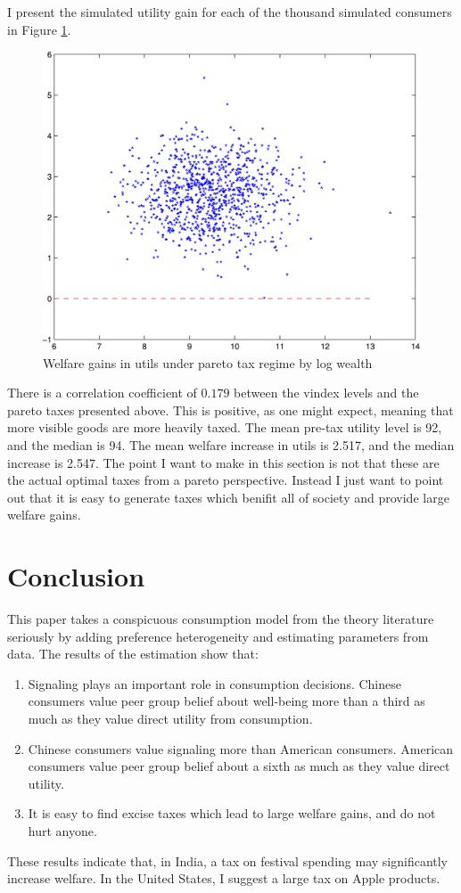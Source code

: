 \documentclass[12pt]{article}
\begin{document}
I present the simulated utility gain for each of the thousand simulated consumers in Figure \ref{fig:taxscatter}.
\begin{figure}
    \centering 
	\includegraphics[scale=.8]{pics/taxscat_cropped.jpg}
    \caption{Welfare gains in utils under pareto tax regime by log wealth}
    \label{fig:taxscatter}
\end{figure}
There is a correlation coefficient of $0.179$ between the vindex levels and the pareto taxes presented above.  This is positive, as one might expect, meaning that more visible goods are more heavily taxed.
The mean pre-tax utility level is 92, and the median is 94.  The mean welfare increase in utils is 2.517, and the median increase is 2.547.  The point I want to make in this section is not that these are the actual optimal taxes from a pareto perspective.  Instead I just want to point out that it is easy to generate taxes which benifit all of society and provide large welfare gains.

\section{Conclusion}
This paper takes a conspicuous consumption model from the theory literature seriously by adding preference heterogeneity and estimating parameters from data.
The results of the estimation show that:
\begin{enumerate}
    \item Signaling plays an important role in consumption decisions.  Chinese consumers value peer group belief about well-being more than a third as much as they value direct utility from consumption.
    \item Chinese consumers value signaling more than American consumers.  American consumers value peer group belief about a sixth as much as they value direct utility.
    \item It is easy to find excise taxes which lead to large welfare gains, and do not hurt anyone.
\end{enumerate}
	These results indicate that, in India, a tax on festival spending may significantly increase welfare.
In the United States, I suggest a large tax on Apple products.
\end{document}
